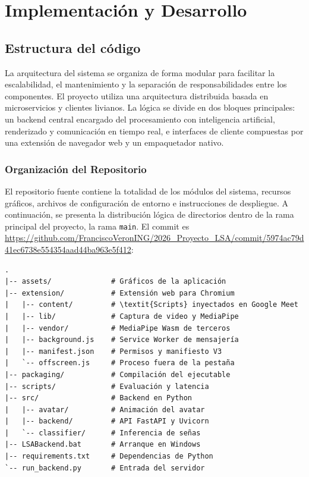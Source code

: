 \chapter{Implementación y Desarrollo}
\label{cap:implementacion}

\section{Estructura del código}
\label{sec:estructura_codigo}

La arquitectura del sistema se organiza de forma modular para facilitar la escalabilidad, el mantenimiento y la separación de responsabilidades entre los componentes. El proyecto utiliza una arquitectura distribuida basada en microservicios y clientes livianos. La lógica se divide en dos bloques principales: un backend central encargado del procesamiento con inteligencia artificial, renderizado y comunicación en tiempo real, e interfaces de cliente compuestas por una extensión de navegador web y un empaquetador nativo.

\subsection{Organización del Repositorio}

El repositorio fuente contiene la totalidad de los módulos del sistema, recursos gráficos, archivos de configuración de entorno e instrucciones de despliegue. A continuación, se presenta la distribución lógica de directorios dentro de la rama principal del proyecto, la rama \texttt{main}. El commit es \url{https://github.com/FranciscoVeronING/2026_Proyecto_LSA/commit/5974ac79d41ec6738e554354aad44ba963e5f412}:

\begin{verbatim}
.
|-- assets/              # Gráficos de la aplicación
|-- extension/           # Extensión web para Chromium
|   |-- content/         # \textit{Scripts} inyectados en Google Meet
|   |-- lib/             # Captura de video y MediaPipe
|   |-- vendor/          # MediaPipe Wasm de terceros
|   |-- background.js    # Service Worker de mensajería
|   |-- manifest.json    # Permisos y manifiesto V3
|   `-- offscreen.js     # Proceso fuera de la pestaña
|-- packaging/           # Compilación del ejecutable
|-- scripts/             # Evaluación y latencia
|-- src/                 # Backend en Python
|   |-- avatar/          # Animación del avatar
|   |-- backend/         # API FastAPI y Uvicorn
|   `-- classifier/      # Inferencia de señas
|-- LSABackend.bat       # Arranque en Windows
|-- requirements.txt     # Dependencias de Python
`-- run_backend.py       # Entrada del servidor
\end{verbatim}

